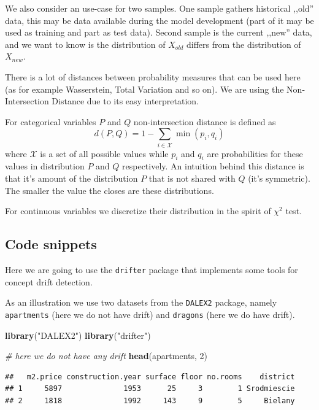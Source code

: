 \documentclass[]{krantz}
\newenvironment{Shaded}{\begin{snugshade}}{\end{snugshade}}
\newcommand{\CommentTok}[1]{\textcolor[rgb]{0.56,0.35,0.01}{\textit{#1}}}
\newcommand{\DecValTok}[1]{\textcolor[rgb]{0.00,0.00,0.81}{#1}}
\newcommand{\KeywordTok}[1]{\textcolor[rgb]{0.13,0.29,0.53}{\textbf{#1}}}
\newcommand{\NormalTok}[1]{#1}
\newcommand{\StringTok}[1]{\textcolor[rgb]{0.31,0.60,0.02}{#1}}
\theoremstyle{definition}
\theoremstyle{definition}
\theoremstyle{definition}
\theoremstyle{remark}
\begin{document}
We also consider an use-case for two samples. One sample gathers
historical ,,old'' data, this may be data available during the model
development (part of it may be used as training and part as test data).
Second sample is the current ,,new'' data, and we want to know is the
distribution of \(X_{old}\) differs from the distribution of
\(X_{new}\).

There is a lot of distances between probability measures that can be
used here (as for example Wasserstein, Total Variation and so on). We
are using the Non-Intersection Distance due to its easy interpretation.

For categorical variables \(P\) and \(Q\) non-intersection distance is
defined as \[
d(P,Q) = 1 - \sum_{i\in \mathcal X} \min(p_i, q_i)
\] where \(\mathcal X\) is a set of all possible values while \(p_i\)
and \(q_i\) are probabilities for these values in distribution \(P\) and
\(Q\) respectively. An intuition behind this distance is that it's
amount of the distribution \(P\) that is not shared with \(Q\) (it's
symmetric). The smaller the value the closes are these distributions.

For continuous variables we discretize their distribution in the spirit
of \(\chi^2\) test.

\hypertarget{code-snippets-2}{%
\subsection{Code snippets}\label{code-snippets-2}}

Here we are going to use the \texttt{drifter} package that implements
some tools for concept drift detection.

As an illustration we use two datasets from the \texttt{DALEX2} package,
namely \texttt{apartments} (here we do not have drift) and
\texttt{dragons} (here we do have drift).

\begin{Shaded}
\begin{Highlighting}[]
\KeywordTok{library}\NormalTok{(}\StringTok{"DALEX2"}\NormalTok{)}
\KeywordTok{library}\NormalTok{(}\StringTok{"drifter"}\NormalTok{)}

\CommentTok{# here we do not have any drift}
\KeywordTok{head}\NormalTok{(apartments, }\DecValTok{2}\NormalTok{)}
\end{Highlighting}
\end{Shaded}

\begin{verbatim}
##   m2.price construction.year surface floor no.rooms    district
## 1     5897              1953      25     3        1 Srodmiescie
## 2     1818              1992     143     9        5     Bielany
\end{verbatim}
\end{document}
